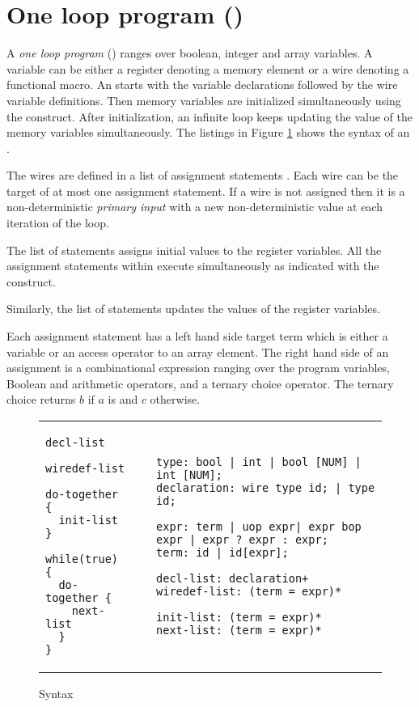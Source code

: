 \section{One loop program (\caig) }
\label{sec:this}
A {\em one loop program} (\caig) ranges over boolean, 
integer and array variables. 
A variable can be either a register denoting a memory element or a wire denoting a functional macro.
An \caig starts with the variable declarations followed by the wire variable definitions. 
Then memory variables are initialized simultaneously using the  construct. 
After initialization, an infinite loop keeps updating the value of the memory variables simultaneously. The listings in Figure \ref{fig:gr} shows the syntax of an \caig. 

The wires are defined in a list of assignment statements . 
Each wire can be the target of at most one assignment statement. 
If a wire is not assigned then it is a non-deterministic {\em primary input}
with a new non-deterministic value at each iteration of the loop. 

The list of statements  assigns initial values to 
the register variables. All the assignment statements within  execute
simultaneously as indicated with the  construct.

Similarly, the  list of statements updates the values 
of the register variables. 

Each assignment statement has a left hand side target term 
which is either a variable or an access operator to an 
array element. 
The right hand side of an assignment is a combinational expression ranging over the program variables,  Boolean and arithmetic operators, and a ternary choice 
operator. The ternary choice  returns $b$ if $a$ 
is \true and $c$ otherwise. 

\begin{figure}
\begin{tabular}{p{3cm}p{0.5cm}p{12cm}}
\begin{lstlisting}
decl-list

wiredef-list

do-together {
  init-list 
}

while(true) {
  do-together {
    next-list
  } 
}
\end{lstlisting}
&
&
\begin{lstlisting}
type: bool | int | bool [NUM] | int [NUM]; 
declaration: wire type id; | type id;

expr: term | uop expr| expr bop expr | expr ? expr : expr;
term: id | id[expr]; 

decl-list: declaration+
wiredef-list: (term = expr)*

init-list: (term = expr)* 
next-list: (term = expr)* 
\end{lstlisting}
\end{tabular}
\caption{\caig Syntax}
\label{fig:gr}
\end{figure}
